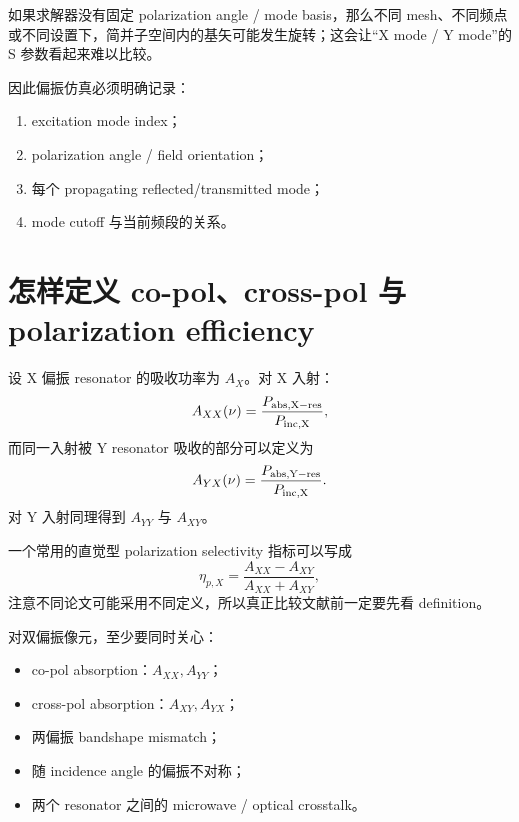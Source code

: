\documentclass[11pt,a4paper,openany]{ctexrep}
\begin{document}
\begin{center}
\end{center}

如果求解器没有固定 polarization angle / mode basis，那么不同 mesh、不同频点或不同设置下，简并子空间内的基矢可能发生旋转；这会让“X mode / Y mode”的 S 参数看起来难以比较。

因此偏振仿真必须明确记录：
\begin{enumerate}
  \item excitation mode index；
  \item polarization angle / field orientation；
  \item 每个 propagating reflected/transmitted mode；
  \item mode cutoff 与当前频段的关系。
\end{enumerate}

\section{怎样定义 co-pol、cross-pol 与 polarization efficiency}

设 X 偏振 resonator 的吸收功率为 $A_X$。对 X 入射：
\[
A_{XX}(\nu)=\frac{P_{\rm abs,X-res}}{P_{\rm inc,X}},
\]
而同一入射被 Y resonator 吸收的部分可以定义为
\[
A_{YX}(\nu)=\frac{P_{\rm abs,Y-res}}{P_{\rm inc,X}}.
\]
对 Y 入射同理得到 $A_{YY}$ 与 $A_{XY}$。

一个常用的直觉型 polarization selectivity 指标可以写成
\[
\eta_{p,X}=\frac{A_{XX}-A_{XY}}{A_{XX}+A_{XY}},
\]
注意不同论文可能采用不同定义，所以真正比较文献前一定要先看 definition。

对双偏振像元，至少要同时关心：
\begin{itemize}
  \item co-pol absorption：$A_{XX},A_{YY}$；
  \item cross-pol absorption：$A_{XY},A_{YX}$；
  \item 两偏振 bandshape mismatch；
  \item 随 incidence angle 的偏振不对称；
  \item 两个 resonator 之间的 microwave / optical crosstalk。
\end{itemize}
\end{document}
